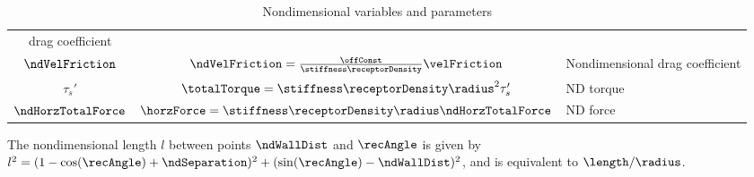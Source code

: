 \begin{table}
\begin{tabular}{c|c|l}
                                                                   drag
                                                                   coefficient
    \\ 
    $\ndVelFriction$ & $\ndVelFriction = \frac{\offConst}{\stiffness
                       \receptorDensity} \velFriction$ &
                                                         Nondimensional
                                                         drag
                                                         coefficient
    \\
    $\tau_s'$ & $\totalTorque = \stiffness \receptorDensity \radius^2
                \tau_s'$ & ND torque \\
    $\ndHorzTotalForce$ & $\horzForce = \stiffness \receptorDensity
                          \radius \ndHorzTotalForce$ & ND force \\
  \end{tabular}
  \caption{Nondimensional variables and parameters}
  \label{tab:nd-vars}
\end{table}

The nondimensional length $l$ between points $\ndWallDist$ and
$\recAngle$ is given by $l^2 = (1 - \cos(\recAngle) + \ndSeparation)^2
+ (\sin(\recAngle) - \ndWallDist)^2$, and is equivalent to
$\length/\radius$.
